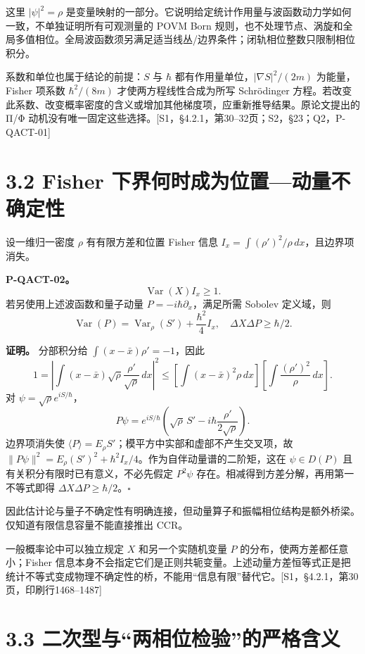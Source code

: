 \documentclass[
  11pt,
  oneside]{book}
\begin{document}
这里 \(|\psi|^2=\rho\)
是变量映射的一部分。它说明给定统计作用量与波函数动力学如何一致，不单独证明所有可观测量的
POVM Born
规则，也不处理节点、涡旋和全局多值相位。全局波函数须另满足适当线丛/边界条件；闭轨相位整数只限制相位积分。

系数和单位也属于结论的前提：\(S\) 与 \(\hbar\)
都有作用量单位，\(|\nabla S|^2/(2m)\) 为能量，Fisher 项系数
\(\hbar^2/(8m)\) 才使两方程线性合成为所写 Schrödinger
方程。若改变此系数、改变概率密度的含义或增加其他梯度项，应重新推导结果。原论文提出的
Π/Φ
动机没有唯一固定这些选择。{[}S1，§4.2.1，第30--32页；S2，§23；Q2，P-QACT-01{]}

\section{3.2 Fisher 下界何时成为位置---动量不确定性}

设一维归一密度 \(\rho\) 有有限方差和位置 Fisher 信息
\(I_x=\int(\rho')^2/\rho\,dx\)，且边界项消失。

\protect\hypertarget{p-qact-02}{}{}

\textbf{P-QACT-02。} \[
\operatorname{Var}(X)I_x\ge1.
\] 若另使用上述波函数和量子动量 \(P=-i\hbar\partial_x\)，满足所需
Sobolev 定义域，则 \[
\operatorname{Var}(P)=\operatorname{Var}_\rho(S')
+\frac{\hbar^2}{4}I_x,
\quad \Delta X\Delta P\ge\hbar/2.
\]

\textbf{证明。} 分部积分给 \(\int(x-\bar x)\rho'=-1\)，因此 \[
1=\left|\int(x-\bar x)\sqrt\rho\frac{\rho'}{\sqrt\rho}\,dx\right|^2
\le\left[\int(x-\bar x)^2\rho\,dx\right]
\left[\int\frac{(\rho')^2}{\rho}\,dx\right].
\] 对 \(\psi=\sqrt\rho e^{iS/\hbar}\)， \[
P\psi=e^{iS/\hbar}\left(\sqrt\rho\,S'-i\hbar\frac{\rho'}{2\sqrt\rho}\right).
\] 边界项消失使
\(\langle P\rangle=E_\rho S'\)；模平方中实部和虚部不产生交叉项，故
\(\|P\psi\|^2=E_\rho(S')^2+\hbar^2I_x/4\)。作为自伴动量谱的二阶矩，这在
\(\psi\in D(P)\) 且有关积分有限时已有意义，不必先假定 \(P^2\psi\)
存在。相减得到方差分解，再用第一不等式即得
\(\Delta X\Delta P\ge\hbar/2\)。\(\square\)

因此估计论与量子不确定性有明确连接，但动量算子和振幅相位结构是额外桥梁。仅知道有限信息容量不能直接推出
CCR。

一般概率论中可以独立规定 \(X\) 和另一个实随机变量 \(P\)
的分布，使两方差都任意小；Fisher
信息本身不会指定它们是正则共轭变量。上述动量方差恒等式正是把统计不等式变成物理不确定性的桥，不能用``信息有限''替代它。{[}S1，§4.2.1，第30页，印刷行1468--1487{]}

\section{3.3 二次型与``两相位检验''的严格含义}
\end{document}
